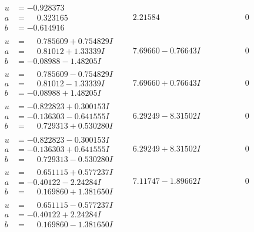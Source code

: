 \documentclass[1p]{elsarticle_modified}
\theoremstyle{definition}
\begin{document}
$$\begin{array}{c|c|c}
\begin{aligned}
u &= -0.928373\phantom{ +0.000000I} \\
a &= \phantom{-}0.323165\phantom{ +0.000000I} \\
b &= -0.614916\phantom{ +0.000000I}\end{aligned}
 & \phantom{-}2.21584\phantom{ +0.000000I} & \phantom{-0.000000 } 0 \\ \hline\begin{aligned}
u &= \phantom{-}0.785609 + 0.754829 I \\
a &= \phantom{-}0.81012 + 1.33339 I \\
b &= -0.08988 - 1.48205 I\end{aligned}
 & \phantom{-}7.69660 - 0.76643 I & \phantom{-0.000000 } 0 \\ \hline\begin{aligned}
u &= \phantom{-}0.785609 - 0.754829 I \\
a &= \phantom{-}0.81012 - 1.33339 I \\
b &= -0.08988 + 1.48205 I\end{aligned}
 & \phantom{-}7.69660 + 0.76643 I & \phantom{-0.000000 } 0 \\ \hline\begin{aligned}
u &= -0.822823 + 0.300153 I \\
a &= -0.136303 - 0.641555 I \\
b &= \phantom{-}0.729313 + 0.530280 I\end{aligned}
 & \phantom{-}6.29249 - 8.31502 I & \phantom{-0.000000 } 0 \\ \hline\begin{aligned}
u &= -0.822823 - 0.300153 I \\
a &= -0.136303 + 0.641555 I \\
b &= \phantom{-}0.729313 - 0.530280 I\end{aligned}
 & \phantom{-}6.29249 + 8.31502 I & \phantom{-0.000000 } 0 \\ \hline\begin{aligned}
u &= \phantom{-}0.651115 + 0.577237 I \\
a &= -0.40122 - 2.24284 I \\
b &= \phantom{-}0.169860 + 1.381650 I\end{aligned}
 & \phantom{-}7.11747 - 1.89662 I & \phantom{-0.000000 } 0 \\ \hline\begin{aligned}
u &= \phantom{-}0.651115 - 0.577237 I \\
a &= -0.40122 + 2.24284 I \\
b &= \phantom{-}0.169860 - 1.381650 I\end{aligned}

\end{array}$$
\end{document}
